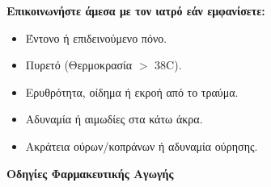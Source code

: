 \documentclass[10pt,greek]{article}
\begin{document}

\textbf{Επικοινωνήστε άμεσα με τον ιατρό εάν εμφανίσετε:}
\begin{itemize}
\item Έντονο ή επιδεινούμενο πόνο.
\item Πυρετό (Θερμοκρασία $>$ 38\textdegree{}C).
\item Ερυθρότητα, οίδημα ή εκροή από το τραύμα.
\item Αδυναμία ή αιμωδίες στα κάτω άκρα.
\item Ακράτεια ούρων/κοπράνων ή αδυναμία ούρησης.
\end{itemize}

\newpage
\begin{center}
\LARGE\textbf{Οδηγίες Φαρμακευτικής Αγωγής}
\end{center}
\vspace{0.5cm}
\end{document}
